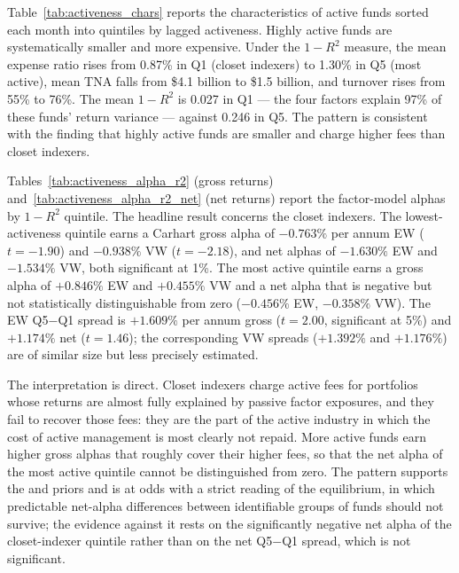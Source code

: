 \documentclass[12pt, oneside]{report}
\begin{document}
Table~\ref{tab:activeness_chars} reports the characteristics of active
funds sorted each month into quintiles by lagged activeness. Highly
active funds are systematically smaller and more expensive. Under the
$1-R^2$ measure, the mean expense ratio rises from 0.87\% in Q1 (closet
indexers) to 1.30\% in Q5 (most active), mean TNA falls from \$4.1
billion to \$1.5 billion, and turnover rises from 55\% to 76\%. The mean
$1-R^2$ is 0.027 in Q1 --- the four factors explain 97\% of these funds'
return variance --- against 0.246 in Q5. The pattern is consistent with
the \textcite{CremersPetajisto2009} finding that highly active funds are
smaller and charge higher fees than closet indexers.



Tables~\ref{tab:activeness_alpha_r2} (gross returns) and~\ref{tab:activeness_alpha_r2_net} (net returns) report the factor-model alphas by
$1-R^2$ quintile. The headline result concerns the closet indexers. The
lowest-activeness quintile earns a Carhart gross alpha of $-0.763\%$ per
annum EW ($t = -1.90$) and $-0.938\%$ VW ($t = -2.18$), and net alphas of
$-1.630\%$ EW and $-1.534\%$ VW, both significant at 1\%. The most
active quintile earns a gross alpha of $+0.846\%$ EW and $+0.455\%$ VW and
a net alpha that is negative but not statistically distinguishable from
zero ($-0.456\%$ EW, $-0.358\%$ VW). The EW Q5$-$Q1
spread is $+1.609\%$ per annum gross ($t = 2.00$, significant at 5\%)
and $+1.174\%$ net ($t = 1.46$); the corresponding VW spreads ($+1.392\%$
and $+1.176\%$) are of similar size but less precisely estimated.



The interpretation is direct. Closet indexers charge active fees for
portfolios whose returns are almost fully explained by passive factor
exposures, and they fail to recover those fees: they are the part of the
active industry in which the cost of active management is most clearly
not repaid. More active funds earn higher gross alphas that roughly cover
their higher fees, so that the net alpha of the most active quintile
cannot be distinguished from zero. The pattern supports the \textcite{AmihudGoyenko2013}
and \textcite{CremersPetajisto2009} priors and is at odds with a strict
reading of the \textcite{BerkGreen2004} equilibrium, in which predictable
net-alpha differences between identifiable groups of funds should not
survive; the evidence against it rests on the significantly negative net
alpha of the closet-indexer quintile rather than on the net Q5$-$Q1
spread, which is not significant.
\end{document}
